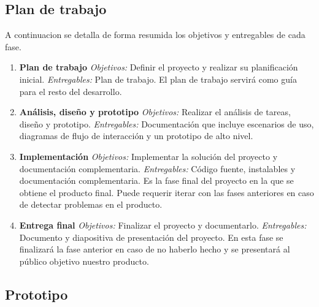 \subsection{Plan de trabajo}
A continuacion se detalla de forma resumida los objetivos y entregables de cada fase.
\begin{enumerate}[1.]
\item \textbf{Plan de trabajo}
\textit{Objetivos: }Definir el proyecto y realizar su planificación inicial.
\textit{Entregables: }Plan de trabajo.
El plan de trabajo servirá como guía para el resto del desarrollo.
\item \textbf{Análisis, diseño y prototipo}
\textit{Objetivos: }Realizar el análisis de tareas, diseño y prototipo.
\textit{Entregables: } Documentación que incluye escenarios de uso, diagramas de flujo de interacción y un prototipo de alto nivel.
\item \textbf{Implementación}
\textit{Objetivos: }Implementar la solución del proyecto y documentación complementaria.
\textit{Entregables: }Código fuente, instalables y documentación complementaria.
Es la fase final del proyecto en la que se obtiene el producto final. Puede requerir iterar con las fases anteriores en caso de detectar problemas en el producto.
\item \textbf{Entrega final}
\textit{Objetivos: }Finalizar el proyecto y documentarlo.
\textit{Entregables: }Documento y diapositiva de presentación del proyecto.
En esta fase se finalizará la fase anterior en caso de no haberlo hecho y se presentará al público objetivo nuestro producto.
\end{enumerate}
\subsection{Prototipo}

